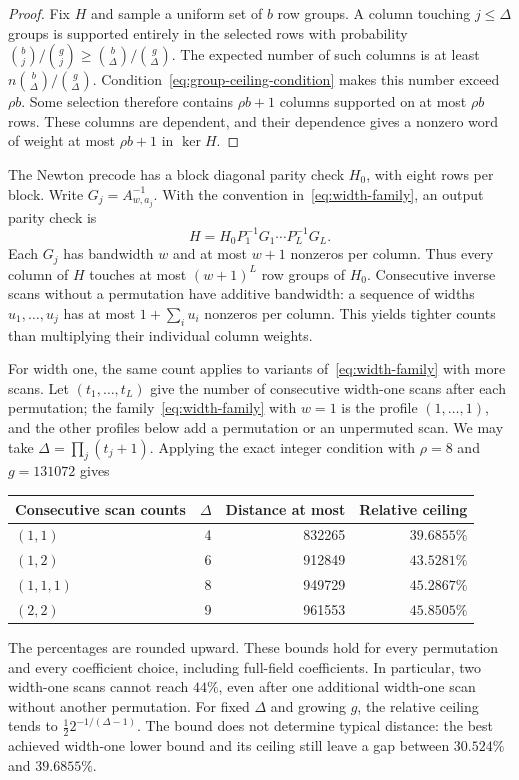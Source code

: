 \begin{proof}
Fix $H$ and sample a uniform set of $b$ row groups. A column touching
$j\le\Delta$ groups is supported entirely in the selected rows with
probability $\binom bj/\binom gj\ge\binom b\Delta/\binom g\Delta$.
The expected number of such columns is at least
$n\binom b\Delta/\binom g\Delta$. Condition~\eqref{eq:group-ceiling-condition}
makes this number exceed $\rho b$. Some selection therefore contains
$\rho b+1$ columns supported on at most $\rho b$ rows. These columns are
dependent, and their dependence gives a nonzero word of weight at most
$\rho b+1$ in $\ker H$.
\end{proof}

The Newton precode has a block diagonal parity check $H_0$, with eight
rows per block. Write $G_j=A_{w,a_j}^{-1}$. With the convention
in~\eqref{eq:width-family}, an output parity check is
\[
 H=H_0P_1^{-1}G_1\cdots P_L^{-1}G_L.
\]
Each $G_j$ has bandwidth $w$ and at most $w+1$ nonzeros per column.
Thus every column of $H$ touches at most $(w+1)^L$ row groups of $H_0$.
Consecutive inverse scans without a permutation have additive
bandwidth: a sequence of widths $u_1,\ldots,u_j$ has at most
$1+\sum_i u_i$ nonzeros per column. This yields tighter counts than
multiplying their individual column weights.

For width one, the same count applies to variants of~\eqref{eq:width-family}
with more scans. Let $(t_1,\ldots,t_L)$ give the number of consecutive
width-one scans after each permutation; the family~\eqref{eq:width-family}
with $w=1$ is the profile $(1,\ldots,1)$, and the other profiles below
add a permutation or an unpermuted scan. We may take
$\Delta=\prod_j(t_j+1)$. Applying the exact integer condition with
$\rho=8$ and $g=131072$ gives
\begin{center}
\begin{tabular}{lrrr}
\toprule
Consecutive scan counts & $\Delta$ & Distance at most & Relative ceiling\\
\midrule
$(1,1)$ & 4 & 832265 & $39.6855\%$\\
$(1,2)$ & 6 & 912849 & $43.5281\%$\\
$(1,1,1)$ & 8 & 949729 & $45.2867\%$\\
$(2,2)$ & 9 & 961553 & $45.8505\%$\\
\bottomrule
\end{tabular}
\end{center}
The percentages are rounded upward. These bounds hold for every
permutation and every coefficient choice, including full-field
coefficients. In particular, two width-one scans cannot reach $44\%$,
even after one additional width-one scan without another permutation.
For fixed $\Delta$ and growing $g$, the relative ceiling tends to
$\tfrac12 2^{-1/(\Delta-1)}$. The bound does not determine typical distance:
the best achieved width-one lower bound and its ceiling still leave
a gap between $30.524\%$ and $39.6855\%$.

